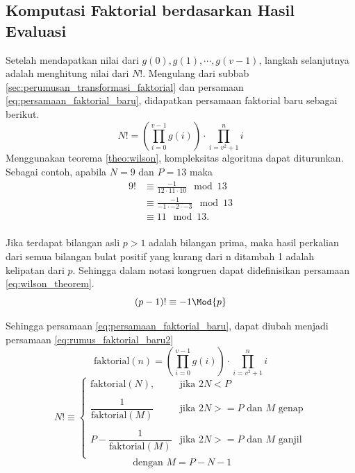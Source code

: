 \subsection{Komputasi Faktorial berdasarkan Hasil Evaluasi}
\label{sec:komputasi_faktorial_multipoint}
Setelah mendapatkan nilai dari $ g(0), g(1), \cdots, g(v-1) $, langkah selanjutnya adalah menghitung nilai dari $ N! $. Mengulang dari subbab \ref{sec:perumusan_transformasi_faktorial} dan persamaan \eqref{eq:persamaan_faktorial_baru}, didapatkan persamaan faktorial baru sebagai berikut.
$$ N ! = \left( \prod_{i=0}^{v-1} g(i) \right) \cdot \prod_{i=v^2+1}^n i $$
Menggunakan teorema \ref{theo:wilson}, kompleksitas algoritma dapat diturunkan. Sebagai contoh, apabila $ N = 9 $ dan $ P = 13 $ maka 
\begin{equation}
	\begin{aligned}
	9! &\equiv \frac{-1}{12 \cdot 11 \cdot 10} \mod{13} \\
	   &\equiv \frac{-1}{-1 \cdot -2 \cdot -3} \mod{13} \\
	   &\equiv 11 \mod{13}. \\
	\end{aligned}
\end{equation}
\begin{theo}
	\label{theo:wilson}
	Jika terdapat bilangan asli $ p > 1 $ adalah bilangan prima, maka hasil perkalian dari semua bilangan bulat positif yang kurang dari n ditambah 1 adalah kelipatan dari $ p $. Sehingga dalam notasi kongruen dapat didefinisikan persamaan \eqref{eq:wilson_theorem}.
	\begin{equation}
		(p - 1)! \equiv -1 \Mod{p}
		\label{eq:wilson_theorem}
	\end{equation}
\end{theo}
Sehingga persamaan \eqref{eq:persamaan_faktorial_baru}, dapat diubah menjadi persamaan \eqref{eq:rumus_faktorial_baru2}
$$ \text{faktorial}(n) = \left( \prod_{i=0}^{v-1} g(i) \right) \cdot \prod_{i=v^2+1}^n i $$
\begin{equation}
	N! \equiv
	\begin{cases}
		\text{faktorial}(N), 	      & \text{jika } 2N < P \\\\
		\dfrac{1}{\text{faktorial}(M)}
		& \text{jika } 2N >= P \text{ dan } M \text{ genap}\\\\
		P -\dfrac{1}{\text{faktorial}(M)}
		& \text{jika } 2N >= P \text{ dan } M \text{ ganjil} \\
	\end{cases}
	\label{eq:rumus_faktorial_baru2}
\end{equation}
$$ \text{ dengan } M = P-N-1 $$

